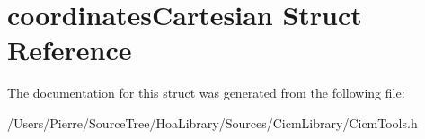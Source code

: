 \hypertarget{structcoordinates_cartesian}{\section{coordinates\-Cartesian Struct Reference}
\label{structcoordinates_cartesian}
}


The documentation for this struct was generated from the following file\-:\begin{DoxyCompactItemize}
\item 
/\-Users/\-Pierre/\-Source\-Tree/\-Hoa\-Library/\-Sources/\-Cicm\-Library/Cicm\-Tools.\-h\end{DoxyCompactItemize}
